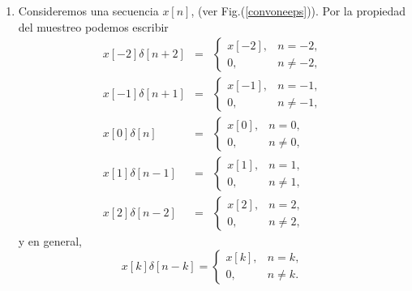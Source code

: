 \begin{enumerate}

\item Consideremos una secuencia $x\left[ n\right]$, (ver
  Fig.(\ref{convoneeps})).  Por la propiedad del muestreo podemos
  escribir
  \begin{eqnarray}
    x[-2]\delta \left[ n+2\right]   &=&     \left\{ \begin{array}{ll}
        x[-2],  & n=-2,                 \\ 
        0,      & n\neq -2,
      \end{array}
    \right.                                         \\
    x[-1]\delta \left[ n+1\right]   &=&     \left\{ \begin{array}{ll}
        x[-1],  & n=-1,                 \\ 
        0,      & n\neq -1,
      \end{array}
    \right.                                                 \\
    x[0]\delta \left[ n\right]      &=&     \left\{ \begin{array}{ll}
        x[0],   & n=0,                  \\ 
        0,      & n\neq 0,
      \end{array}
    \right.                                                 \\
    x[1]\delta \left[ n-1\right]    &=&     \left\{ \begin{array}{ll}
        x[1],   & n=1,                  \\ 
        0,      & n\neq 1,
      \end{array}
    \right.                                                 \\
    x[2]\delta \left[ n-2\right]   &=&     \left\{ \begin{array}{ll}
        x[2],   & n=2,                  \\ 
        0,      & n\neq 2,
      \end{array}
    \right.
  \end{eqnarray}
  y en general,
  \begin{equation}
    x[k]\delta \left[ n-k\right] =  \left\{ \begin{array}{ll}
        x[k],   & n=k,          \\ 
        0,      & n\neq k.
      \end{array}
    \right.
  \end{equation}


\end{enumerate}

